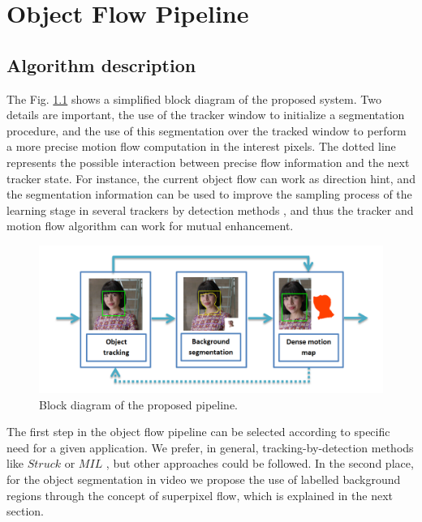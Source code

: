 
\chapter{Object Flow Pipeline} \label{chap:core}

\section{Algorithm description}
\label{sec:desc}

The Fig. \ref{figurelabel_sys} shows a simplified block diagram of the proposed system. Two details are important, 
the use of the tracker window to initialize a segmentation procedure, and the use of this segmentation over the tracked window 
to perform a more precise motion flow computation in the interest pixels. The dotted line represents the possible interaction 
between precise flow information and the next tracker state. For instance, the current object flow can work as direction hint, and 
the segmentation information can be used to improve the sampling process of the learning stage in several trackers by detection methods \cite{c22}, and 
thus the tracker and motion flow algorithm can work for mutual enhancement.

   \begin{figure}[thpb]
      \centering
      \includegraphics[width=1.00\textwidth]{../images/system.png}
      \caption{Block diagram of the proposed pipeline.}
      \label{figurelabel_sys}
   \end{figure}

The first step in the object flow pipeline can be selected according to specific need for a given application. We prefer, in general, tracking-by-detection methods 
like $Struck$ \cite{c22} or $MIL$ \cite{c23}, but other approaches could be followed. In the second place, for the object segmentation in video we propose the use 
of labelled background regions through the concept of superpixel flow, which is explained in the next section.


